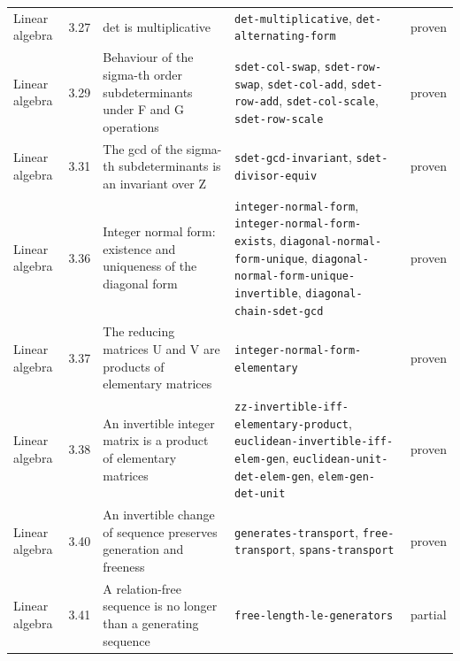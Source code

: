 \begin{longtable}{@{}ll>{\raggedright\arraybackslash}p{4.2cm}>{\raggedright\arraybackslash}p{4.2cm}l@{}}
Linear algebra & 3.27 & det is multiplicative & \texttt{det-\allowbreak{}multiplicative}, \texttt{det-\allowbreak{}alternating-\allowbreak{}form} & proven \\
Linear algebra & 3.29 & Behaviour of the sigma-th order subdeterminants under F and G operations & \texttt{sdet-\allowbreak{}col-\allowbreak{}swap}, \texttt{sdet-\allowbreak{}row-\allowbreak{}swap}, \texttt{sdet-\allowbreak{}col-\allowbreak{}add}, \texttt{sdet-\allowbreak{}row-\allowbreak{}add}, \texttt{sdet-\allowbreak{}col-\allowbreak{}scale}, \texttt{sdet-\allowbreak{}row-\allowbreak{}scale} & proven \\
Linear algebra & 3.31 & The gcd of the sigma-th subdeterminants is an invariant over Z & \texttt{sdet-\allowbreak{}gcd-\allowbreak{}invariant}, \texttt{sdet-\allowbreak{}divisor-\allowbreak{}equiv} & proven \\
Linear algebra & 3.36 & Integer normal form: existence and uniqueness of the diagonal form & \texttt{integer-\allowbreak{}normal-\allowbreak{}form}, \texttt{integer-\allowbreak{}normal-\allowbreak{}form-\allowbreak{}exists}, \texttt{diagonal-\allowbreak{}normal-\allowbreak{}form-\allowbreak{}unique}, \texttt{diagonal-\allowbreak{}normal-\allowbreak{}form-\allowbreak{}unique-\allowbreak{}invertible}, \texttt{diagonal-\allowbreak{}chain-\allowbreak{}sdet-\allowbreak{}gcd} & proven \\
Linear algebra & 3.37 & The reducing matrices U and V are products of elementary matrices & \texttt{integer-\allowbreak{}normal-\allowbreak{}form-\allowbreak{}elementary} & proven \\
Linear algebra & 3.38 & An invertible integer matrix is a product of elementary matrices & \texttt{zz-\allowbreak{}invertible-\allowbreak{}iff-\allowbreak{}elementary-\allowbreak{}product}, \texttt{euclidean-\allowbreak{}invertible-\allowbreak{}iff-\allowbreak{}elem-\allowbreak{}gen}, \texttt{euclidean-\allowbreak{}unit-\allowbreak{}det-\allowbreak{}elem-\allowbreak{}gen}, \texttt{elem-\allowbreak{}gen-\allowbreak{}det-\allowbreak{}unit} & proven \\
Linear algebra & 3.40 & An invertible change of sequence preserves generation and freeness & \texttt{generates-\allowbreak{}transport}, \texttt{free-\allowbreak{}transport}, \texttt{spans-\allowbreak{}transport} & proven \\
Linear algebra & 3.41 & A relation-free sequence is no longer than a generating sequence & \texttt{free-\allowbreak{}length-\allowbreak{}le-\allowbreak{}generators} & partial \\

\end{longtable}
